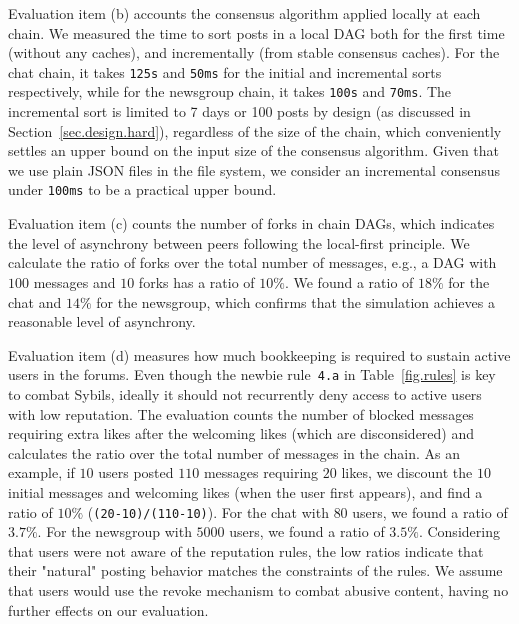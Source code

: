 \documentclass[12pt]{article}
\newcommand{\code}[1]  {\texttt{\footnotesize{#1}}}
\begin{document}
Evaluation item (b) accounts the consensus algorithm applied locally at each
chain.
We measured the time to sort posts in a local DAG both for the first time
(without any caches), and incrementally (from stable consensus caches).
%
For the chat chain, it takes \texttt{125s} and \texttt{50ms} for the initial
and incremental sorts respectively, while for the newsgroup chain, it takes
\texttt{100s} and \texttt{70ms}.
%
%
The incremental sort is limited to 7 days or 100 posts by design (as discussed
in Section~\ref{sec.design.hard}), regardless of the size of the chain, which
conveniently settles an upper bound on the input size of the consensus
algorithm.
%
Given that we use plain JSON files in the file system, we consider an
incremental consensus under \texttt{100ms} to be a practical upper bound.

Evaluation item (c) counts the number of forks in chain DAGs, which indicates
the level of asynchrony between peers following the local-first principle.
We calculate the ratio of forks over the total number of messages, e.g., a DAG
with $100$ messages and $10$ forks has a ratio of $10\%$.
We found a ratio of $18\%$ for the chat and $14\%$ for the newsgroup, which
confirms that the simulation achieves a reasonable level of asynchrony.

Evaluation item (d) measures how much bookkeeping is required to sustain active
users in the forums.
Even though the newbie rule~\code{4.a} in Table~\ref{fig.rules} is key to
combat Sybils, ideally it should not recurrently deny access to active users
with low reputation.
%
The evaluation counts the number of blocked messages requiring extra likes
after the welcoming likes (which are disconsidered) and calculates the ratio
over the total number of messages in the chain.
As an example, if $10$ users posted $110$ messages requiring $20$ likes, we
discount the $10$ initial messages and welcoming likes (when the user first
appears), and find a ratio of $10\%$ (\code{(20-10)/(110-10)}).
%
For the chat with $80$ users, we found a ratio of $3.7\%$.
For the newsgroup with $5000$ users, we found a ratio of $3.5\%$.
%
Considering that users were not aware of the reputation rules, the low ratios
indicate that their "natural" posting behavior matches the constraints of the
rules.
%
We assume that users would use the revoke mechanism to combat abusive content,
having no further effects on our evaluation.
\end{document}
